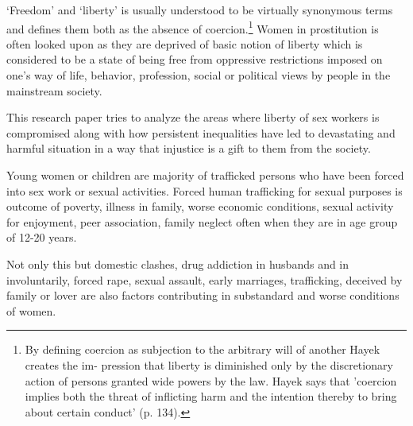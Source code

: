\begin{multicols}{2}
\noi
‘Freedom’ and ‘liberty’ is usually understood to be virtually synonymous terms and defines them
both as the absence of coercion.\footnote{By defining coercion as subjection to the arbitrary will of another Hayek creates the im- pression that liberty is diminished only by the discretionary action of persons granted wide powers by the law. Hayek says that 'coercion
implies both the threat of inflicting harm and the intention thereby to bring about certain conduct' (p. 134).} Women in prostitution is often looked upon as they are
deprived of basic notion of liberty which is considered to be a state of being free from
oppressive restrictions imposed on one's way of life, behavior, profession, social or political
views by people in the mainstream society.

\noi
This research paper tries to analyze the areas where liberty of sex workers is compromised
along with how persistent inequalities have led to devastating and harmful situation in a way
that injustice is a gift to them from the society.


\noi
Young women or children are majority of trafficked persons who have been forced into sex
work or sexual activities. Forced human trafficking for sexual purposes is outcome of poverty,
illness in family, worse economic conditions, sexual activity for enjoyment, peer association,
family neglect often when they are in age group of 12-20 years.

\noi
Not only this but domestic clashes, drug addiction in husbands and in involuntarily, forced
rape, sexual assault, early marriages, trafficking, deceived by family or lover are also factors
contributing in substandard and worse conditions of women.

\vspace{-.15cm}


\end{multicols}
